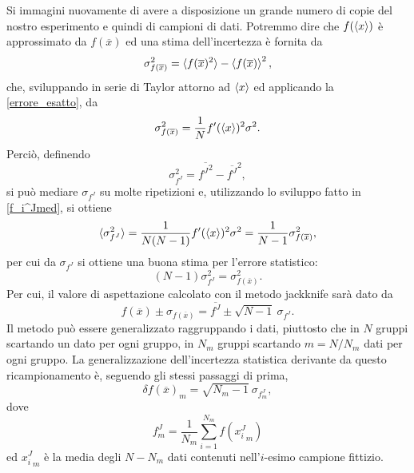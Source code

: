 \documentclass[LaM]{sapthesis}
\begin{document}
	Si immagini nuovamente di avere a disposizione un grande numero di copie del nostro esperimento e quindi di campioni di dati. Potremmo dire che $f(\braket{x})$ è approssimato da $f(\overline{x})$ ed una stima dell'incertezza è fornita da
	\begin{equation*}
		\sigma_{f(\overline{x})}^2=\braket{f(\overline{x})^2}-\braket{f(\overline{x})}^2,
	\end{equation*}
	che, sviluppando in serie di Taylor attorno ad $\braket{x}$ ed applicando la \eqref{errore_esatto}, da
	\begin{equation}
	\sigma_{f(\overline{x})}^2=\frac{1}{N}f'(\braket{x})^2\sigma^2.
	\end{equation}
	Perciò, definendo
	\begin{equation*}
		\sigma_{f^J}^2=\overline{{f^J}^2}-\overline{f^J}^2,
	\end{equation*}
	si può mediare $\sigma_{f^J}$ su molte ripetizioni e, utilizzando lo sviluppo fatto in \eqref{f_i^Jmed}, si ottiene
	\begin{equation*}
	\braket{\sigma_{f^J}^2}=\frac{1}{N(N-1)}f'(\braket{x})^2\sigma^2=\frac{1}{N-1}\sigma_{f(\overline{x})}^2,
	\end{equation*}
	per cui da $\sigma_{f^J}$ si ottiene una buona stima per l'errore statistico:
	\begin{equation}
	(N-1)\sigma_{f^J}^2=\sigma_{f(\overline{x})}^2.
	\end{equation}
	Per cui, il valore di aspettazione calcolato con il metodo jackknife sarà dato da
	\begin{equation}
		f(\overline{x})\pm \sigma_{f(\overline{x})} = \overline{f^J} \pm \sqrt{N-1} \ \sigma_{f^J}.
	\end{equation}
	Il metodo può essere generalizzato raggruppando i dati, piuttosto che in $N$ gruppi scartando un dato per ogni gruppo, in $N_m$ gruppi scartando $m=N/N_m$ dati per ogni gruppo. La generalizzazione dell'incertezza statistica derivante da questo ricampionamento è, seguendo gli stessi passaggi di prima,
	\begin{equation}
		\delta f(\overline{x})_m=\sqrt{N_m-1} \ \sigma_{f^J_m},
	\end{equation}
	dove
	\begin{equation}
		f^J_m=\frac{1}{N_m}\sum_{i=1}^{N_m}f({x_i^J}_m)
	\end{equation}
	ed ${x_i^J}_m$ è la media degli $N-N_m$ dati contenuti nell'$i$-esimo campione fittizio.
	
\end{document}
